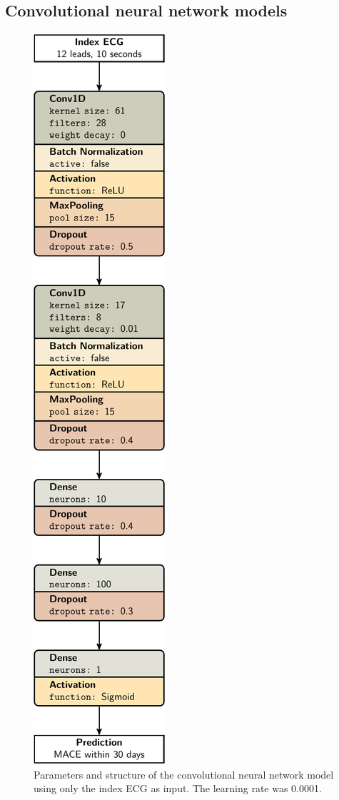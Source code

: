 \documentclass[preprint]{elsarticle}
\begin{document}
\subsection{Convolutional neural network models}
\begin{figure}[H]
\centering
\includegraphics[scale=\modelscale,keepaspectratio]{figures/model-cnn1.pdf}
\caption{Parameters and structure of the convolutional neural network model using only the index ECG as input. The learning rate was 0.0001.}
\end{figure}
\end{document}
